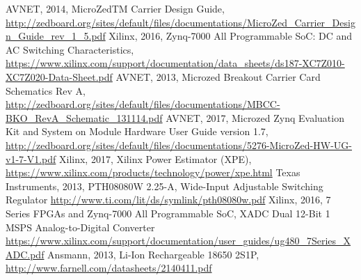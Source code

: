 \begin{thebibliography}{21} %
    AVNET, 2014, MicroZedTM Carrier Design Guide, \url{http://zedboard.org/sites/default/files/documentations/MicroZed_Carrier_Design_Guide_rev_1_5.pdf}
  	Xilinx, 2016, Zynq-7000 All Programmable SoC: DC and AC Switching Characteristics, \url{https://www.xilinx.com/support/documentation/data_sheets/ds187-XC7Z010-XC7Z020-Data-Sheet.pdf}
  	AVNET, 2013, Microzed Breakout Carrier Card Schematics Rev A, \url{http://zedboard.org/sites/default/files/documentations/MBCC-BKO_RevA_Schematic_131114.pdf}
  	AVNET, 2017, Microzed Zynq Evaluation Kit and System on Module Hardware User Guide version 1.7, \url{http://zedboard.org/sites/default/files/documentations/5276-MicroZed-HW-UG-v1-7-V1.pdf}
  	Xilinx, 2017, Xilinx Power Estimator (XPE), \url{https://www.xilinx.com/products/technology/power/xpe.html}
  	Texas Instruments, 2013, PTH08080W 2.25-A, Wide-Input Adjustable Switching Regulator \url{http://www.ti.com/lit/ds/symlink/pth08080w.pdf}
    Xilinx, 2016, 7 Series FPGAs and Zynq-7000 All Programmable SoC, XADC Dual 12-Bit 1 MSPS Analog-to-Digital Converter \url{https://www.xilinx.com/support/documentation/user_guides/ug480_7Series_XADC.pdf}
    Ansmann, 2013, Li-Ion Rechargeable 18650 2S1P, \url{http://www.farnell.com/datasheets/2140411.pdf}
\end{thebibliography}
